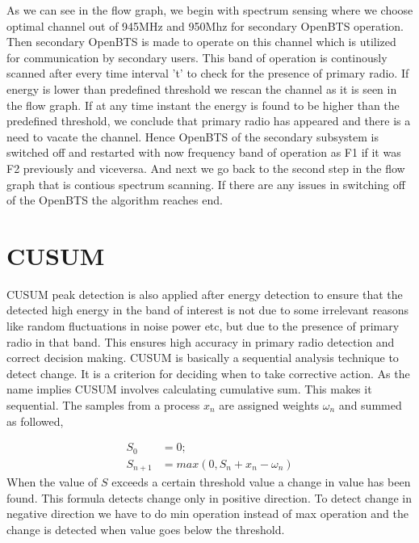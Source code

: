 As we can see in the flow graph, we begin with spectrum sensing where we choose optimal channel out of 945MHz and 950Mhz for secondary OpenBTS operation.
Then secondary OpenBTS is made to operate on this channel which is utilized for communication by secondary users. 
This band of operation is continously scanned after every time interval 't' to check for the presence of primary radio. If energy is lower than predefined threshold we rescan the channel as it is seen in the flow graph.
If at any time instant the energy is found to be higher than the predefined threshold,
 we conclude that primary radio has appeared and there is a need to vacate the channel. Hence  OpenBTS of the secondary subsystem is switched off and 
restarted with now frequency band of operation as F1 if it was F2 previously and viceversa. And next we go back to the second step in the flow graph that is contious spectrum scanning. 
If there are any issues in switching off of the OpenBTS the algorithm reaches end.





\section{CUSUM}
CUSUM peak detection is also applied after energy detection to ensure that the
detected high energy in the band of interest is not due to some irrelevant 
reasons like random fluctuations in noise power etc, but due to the presence of 
primary radio in that band. This ensures high accuracy in primary radio 
detection and correct decision making.
CUSUM is basically a sequential analysis technique to detect change. 
It is a criterion for deciding when to take corrective action. As the name 
implies CUSUM involves calculating cumulative sum. This makes it sequential. 
The samples from a process $x_n$  are assigned weights $\omega_n$  and summed 
as followed,

\begin{align}
S_0 &= 0; \nonumber \\
S_{n+1} &= max(0, S_n + x_n - \omega_n) \nonumber
\end{align}
When the value of $S$ exceeds a certain threshold value a change in value has 
been found. This formula detects change only in positive direction. To detect 
change in negative direction we have to do min operation instead of max 
operation and the change  is detected when value goes below the threshold.

